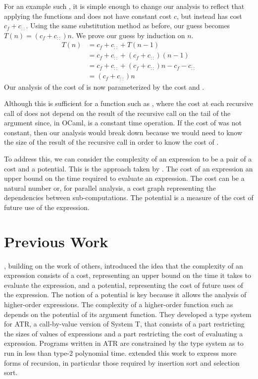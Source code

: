 For an example such , it is simple enough to change our analysis to
reflect that applying the functions  and \T{::} does not have constant
cost $c$, but instead has cost $c_f + c_{::}$.  Using the same substitution
method as before, our guess becomes $T(n) = (c_f + c_{::})n$.  We prove our
guess by induction on $n$.
%
\begin{align*}
  T(n) &= c_f + c_{::} + T(n-1) \\
       &= c_f + c_{::} + (c_f + c_{::})(n-1) \\
       &= c_f + c_{::} + (c_f + c_{::})n - c_f - c_{::}  \\
       &= (c_f + c_{::})n
\end{align*}
%
Our analysis of the cost of  is now parameterized by the cost  and
\T{::}.

Although this is sufficient for a function such as , where the cost at
each recursive call of  does not depend on the result of the recursive
call on the tail of the argument since, in OCaml, \T{::} is a constant time
operation.  If the cost of \T{::} was not constant, then our analysis would
break down because we would need to know the size of the result of the
recursive call in order to know the cost of \T{::}.

To address this, we can consider the complexity of an expression to be a
pair of a cost and a potential.  This is the approach taken by
\citet{Danner2007}.  The cost of an expression an upper bound on the time
required to evaluate an expression.  The cost can be a natural number or, for
parallel analysis, a cost graph representing the dependencies between
sub-computations.  The potential is a measure of the cost of future use of the
expression.

\section{Previous Work}

\paragraph{}
\citet{Danner2007}, building on the work of others, introduced the
idea that the complexity of an expression consists of a cost, representing an
upper bound on the time it takes to evaluate the expression, and a potential,
representing the cost of future uses of the expression.  The notion of a
potential is key because it allows the analysis of higher-order expressions.
The complexity of a higher-order function such as  depends on the
potential of its argument function.  They developed a type system for ATR, a
call-by-value version of System T, that consists of a part restricting the sizes of
values of expressions and a part restricting the cost of evaluating a
expression.  Programs written in ATR are constrained by the type system as to
run in less than type-2 polynomial time.  \citet{Danner2009} extended this work
to express more forms of recursion, in particular those required by insertion
sort and selection sort.

